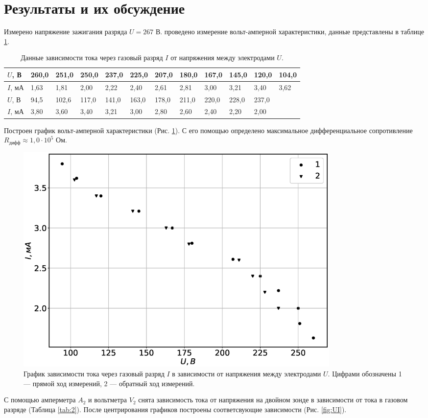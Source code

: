 \documentclass[12pt]{article}
\begin{document}
\section*{Результаты и их обсуждение}
Измерено напряжение зажигания разряда $U = 267$ В.
проведено измерение вольт-амперной характеристики, данные представлены
в таблице \ref{tab:1}.
\begin{table}[H]
	\centering
	\begin{tabular}{|l|l|l|l|l|l|l|l|l|l|l|l|}
		\hline
		$U$, В  & 260,0 & 251,0 & 250,0 & 237,0 & 225,0 & 207,0 & 180,0 & 167,0 & 145,0 & 120,0 & 104,0 \\ \hline
		$I$, мА & 1,63  & 1,81  & 2,00  & 2,22  & 2,40  & 2,61  & 2,81  & 3,00  & 3,21  & 3,40  & 3,62  \\ \hline
		$U$, В  & 94,5  & 102,6 & 117,0 & 141,0 & 163,0 & 178,0 & 211,0 & 220,0 & 228,0 & 237,0 & ~     \\ \hline
		$I$, мА & 3,80  & 3,60  & 3,40  & 3,21  & 3,00  & 2,80  & 2,60  & 2,40  & 2,20  & 2,00  & ~     \\ \hline
	\end{tabular}
	\caption{Данные зависимости тока через газовый разряд $I$ от напряжения между электродами $U$.}
	\label{tab:1}
\end{table}

Построен график вольт-амперной характеристики (Рис. \ref{fig:UpIp}). С его помощью определено максимальное дифференциальное
сопротивление $R_{\text{дифф}} \approx 1,0 \cdot 10^5$ Ом.
\begin{figure}[H]
	\centering
	\includegraphics[width=0.8\textwidth]{UpIp.eps}
	\caption{График зависимости тока через газовый разряд $I$ в зависимости от напряжения между электродами $U$.
		Цифрами обозначены 1 --- прямой ход измерений, 2 --- обратный ход измерений.}
	\label{fig:UpIp}
\end{figure}
С помощью амперметра $A_2$  и вольтметра $V_2$ снята зависимость тока от напряжения на двойном зонде в зависимости от тока в газовом
разряде (Таблица \ref{tab:2}).
После центрирования графиков построены соответсвующие зависимости (Рис. \ref{fig:UI}).
\end{document}
